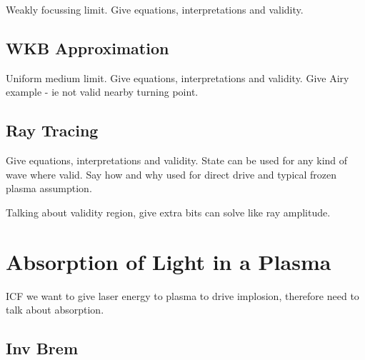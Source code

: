 Weakly focussing limit.
Give equations, interpretations and validity.

\subsection{WKB Approximation}%
\label{sec:theory_WKB}

Uniform medium limit.
Give equations, interpretations and validity.
Give Airy example - ie not valid nearby turning point.

\subsection{Ray Tracing}%
\label{sec:theory_rays}

Give equations, interpretations and validity.
State can be used for any kind of wave where valid.
Say how and why used for direct drive and typical frozen plasma assumption.

Talking about validity region, give extra bits can solve like ray amplitude.


\section{Absorption of Light in a Plasma}%
\label{sec:theory_absorption}

ICF we want to give laser energy to plasma to drive implosion, therefore need to talk about absorption.

\subsection{Inv Brem}%
\label{sec:theory_in_brem}

